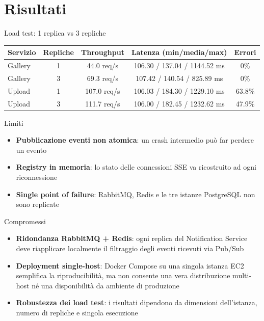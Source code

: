 \documentclass[10pt]{beamer}
\begin{document}
\section{Risultati}
\begin{frame}{Load test: 1 replica vs 3 repliche}
\begin{table}
\centering
\small
\begin{tabular}{lcccc}
\toprule
\textbf{Servizio} & \textbf{Repliche} & \textbf{Throughput} & \textbf{Latenza (min/media/max)} & \textbf{Errori} \\
\midrule
Gallery  & 1 & 44.0 req/s  & 106.30 / 137.04 / 1144.52 ms & 0\% \\
Gallery  & 3 & 69.3 req/s  & 107.42 / 140.54 / 825.89 ms  & 0\% \\
\midrule
Upload   & 1 & 107.0 req/s & 106.03 / 184.30 / 1229.10 ms & 63.8\% \\
Upload   & 3 & 111.7 req/s & 106.00 / 182.45 / 1232.62 ms & 47.9\% \\
\bottomrule
\end{tabular}
\end{table}
\end{frame}

\begin{frame}{Limiti}
\begin{itemize}
    \item \textbf{Pubblicazione eventi non atomica}: un crash intermedio può far perdere un evento
    \item \textbf{Registry in memoria}: lo stato delle connessioni SSE va ricostruito ad ogni riconnessione
    \item \textbf{Single point of failure}: RabbitMQ, Redis e le tre istanze PostgreSQL non sono replicate
\end{itemize}
\end{frame}

\begin{frame}{Compromessi}
	\begin{itemize}
	    \item \textbf{Ridondanza RabbitMQ + Redis}: ogni replica del Notification Service deve riapplicare localmente il filtraggio degli eventi ricevuti via Pub/Sub
        \item \textbf{Deployment single-host}: Docker Compose su una singola istanza EC2 semplifica la riproducibilità, ma non consente una vera distribuzione multi-host né una disponibilità da ambiente di produzione
    \item \textbf{Robustezza dei load test}: i risultati dipendono da dimensioni dell'istanza, numero di repliche e singola esecuzione
	\end{itemize}
\end{frame}
\end{document}
